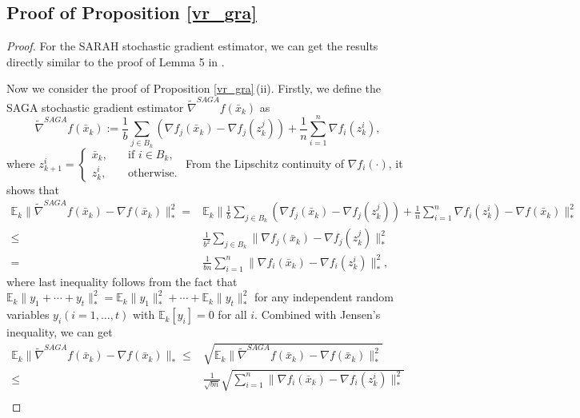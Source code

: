 \documentclass[letterpaper]{article} %
\begin{document}
	\subsection{Proof of  Proposition \ref{vr_gra}}\label{proof_vr_gra}
	\begin{proof}
		For the SARAH stochastic gradient estimator,  we can get the results directly similar to the proof of Lemma 5 in \cite{WangH23}.

		Now we  consider the proof of Proposition \ref{vr_gra}\,(ii). Firstly, we define the SAGA stochastic gradient estimator $\tilde{\nabla}^{SAGA}f(\bar{x}_{k})$ as
		\[
		\tilde{\nabla}^{SAGA}f(\bar{x}_{k}):= \frac{1}{b}\sum_{j\in B_{k}}\left(\nabla f_{j}(\bar{x}_{k})-\nabla f_{j}(z_{k}^{j})\right)+\frac{1}{n}\sum_{i=1}^{n}\nabla f_{i}(z_{k}^{i}),
		\]
		where $ z_{k+1}^{i}=\begin{cases}
			\bar{x}_{k},\quad&\text{if }i\in B_{k},\\
			z_{k}^{i},\quad &\text{otherwise}.
		\end{cases}$
		From the Lipschitz continuity of $\nabla f_{i}(\cdot)$, it shows that
		\begin{align*}
			\mathbb{E}_{k}\|\tilde{\nabla}^{SAGA}f(\bar{x}_{k})-\nabla f(\bar{x}_{k})\|_{*}^{2}
			=&\mathbb{E}_{k}\|\frac{1}{b}\sum_{j\in B_{k}}\left(\nabla f_{j}(\bar{x}_{k})-\nabla f_{j}(z_{k}^{j})\right)+\frac{1}{n}\sum_{i=1}^{n}\nabla f_{i}(z_{k}^{i})-\nabla f(\bar{x}_{k})\|_{*}^{2}\\
			\le&\frac{1}{b^{2}}\sum_{j\in B_{k}}\|\nabla f_{j}(\bar{x}_{k})-\nabla f_{j}(z_{k}^{j})\|_{*}^{2}\\
			=&\frac{1}{bn}\sum_{i=1}^{n}\|\nabla f_{i}(\bar{x}_{k})-\nabla f_{i}(z_{k}^{i})\|_{*}^{2},
		\end{align*}
		where last inequality follows from the fact that $\mathbb{E}_{k}\|y_{1}+\cdots+y_{t}\|_{*}^{2}=\mathbb{E}_{k}\|y_{1}\|_{*}^{2}+\cdots+\mathbb{E}_{k}\|y_{t}\|_{*}^{2}$ for any independent random variables $y_{i} (i=1,\dots,t)$ with $\mathbb{E}_{k}[y_{i}]=0$ for all $i$. Combined with Jensen's inequality, we can get
		\begin{align*}
			\mathbb{E}_{k}\|\tilde{\nabla}^{SAGA}f(\bar{x}_{k})-\nabla f(\bar{x}_{k})\|_{*}
			\le&\sqrt{\mathbb{E}_{k}\|\tilde{\nabla}^{SAGA}f(\bar{x}_{k})-\nabla f(\bar{x}_{k})\|_{*}^{2}}\\
			\le&\frac{1}{\sqrt{bn}}\sqrt{\sum_{i=1}^{n}\|\nabla f_{i}(\bar{x}_{k})-\nabla f_{i}(z_{k}^{i})\|_{*}^{2}}\\

\end{align*}
\end{proof}
\end{document}
